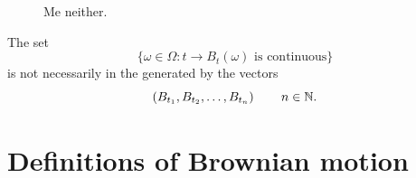 \documentclass[12pt]{report}
\begin{document}
\begin{enumerate}
\begin{figure}[h]
		\caption{Me neither.}
		\label{fig:screenshot005}
	\end{figure}
	\begin{remark}
		The set
		\begin{equation*}
			\{\omega\in\Omega:t\to B_{t}(\omega)\text{ is continuous}\}
		\end{equation*}
		is not necessarily in the \sa{} generated by the vectors
		\begin{equation*}
			\left(B_{t_{1}}, B_{t_{2}},\ldots,B_{t_{n}}\right)\qquad n\in\mathbb{N}.
		\end{equation*}
	\end{remark}
\end{enumerate}
\section{Definitions of Brownian motion}
\end{document}
